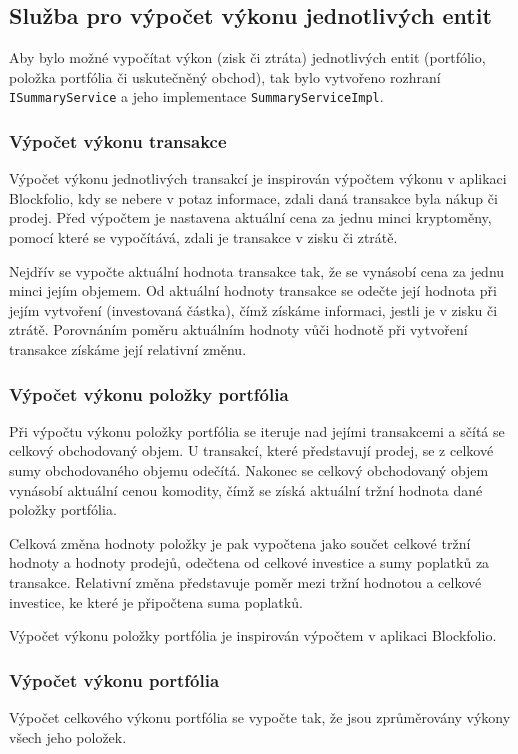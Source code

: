\documentclass[12pt, a4paper]{article}
\begin{document}
    \subsection{Služba pro výpočet výkonu jednotlivých entit}
    Aby bylo možné vypočítat výkon (zisk či ztráta) jednotlivých entit (portfólio, položka portfólia či uskutečněný obchod), tak bylo vytvořeno rozhraní \texttt{ISummaryService} a jeho implementace \texttt{SummaryServiceImpl}.
    
    \subsubsection{Výpočet výkonu transakce}
    Výpočet výkonu jednotlivých transakcí je inspirován výpočtem výkonu v aplikaci Blockfolio, kdy se nebere v potaz informace, zdali daná transakce byla nákup či prodej.
    Před výpočtem je nastavena aktuální cena za jednu minci kryptoměny, pomocí které se vypočítává, zdali je transakce v zisku či ztrátě.
    
    Nejdřív se vypočte aktuální hodnota transakce tak, že se vynásobí cena za jednu minci jejím objemem.
    Od aktuální hodnoty transakce se odečte její hodnota při jejím vytvoření (investovaná částka), čímž získáme informaci, jestli je v zisku či ztrátě.
    Porovnáním poměru aktuálním hodnoty vůči hodnotě při vytvoření transakce získáme její relativní změnu.
    
    \subsubsection{Výpočet výkonu položky portfólia}
    Při výpočtu výkonu položky portfólia se iteruje nad jejími transakcemi a sčítá se celkový obchodovaný objem.
    U transakcí, které představují prodej, se z celkové sumy obchodovaného objemu odečítá.
    Nakonec se celkový obchodovaný objem vynásobí aktuální cenou komodity, čímž se získá aktuální tržní hodnota dané položky portfólia.
    
    Celková změna hodnoty položky je pak vypočtena jako součet celkové tržní hodnoty a hodnoty prodejů, odečtena od celkové investice a sumy poplatků za transakce. 
    Relativní změna představuje poměr mezi tržní hodnotou a celkové investice, ke které je připočtena suma poplatků.
    
    Výpočet výkonu položky portfólia je inspirován výpočtem v aplikaci Blockfolio.
    
    \subsubsection{Výpočet výkonu portfólia}
    Výpočet celkového výkonu portfólia se vypočte tak, že jsou zprůměrovány výkony všech jeho položek.
\end{document}
